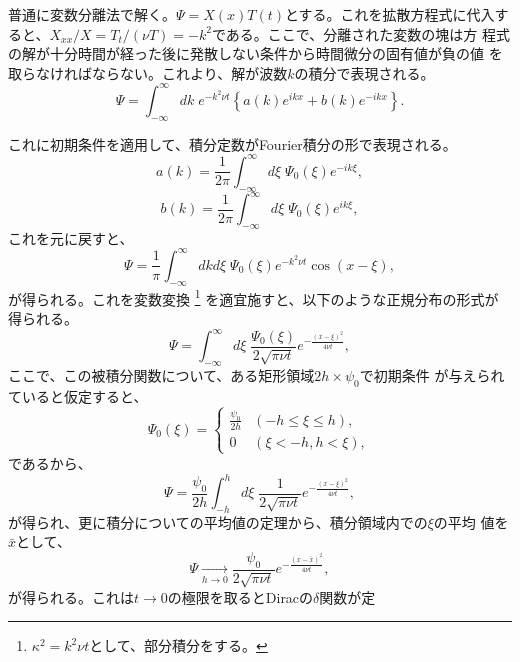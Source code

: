 普通に変数分離法で解く。$\Psi=X(x)T(t)$とする。これを拡散方程式に代入す
ると、$X_{xx}/X=T_t/(\nu T)=-k^2$である。ここで、分離された変数の塊は方
程式の解が十分時間が経った後に発散しない条件から時間微分の固有値が負の値
を取らなければならない。これより、解が波数$k$の積分で表現される。
\begin{equation}
 \Psi = \int_{-\infty}^{\infty}dk\mspace{5mu}
  e^{-k^2\nu t}\left\{a(k)e^{ikx}+b(k)e^{-ikx}\right\}.
\end{equation}

これに初期条件を適用して、積分定数がFourier積分の形で表現される。
\begin{equation}
 a(k) = \frac{1}{2\pi}\int_{-\infty}^{\infty}d\xi\mspace{5mu}\Psi_0(\xi)e^{-ik\xi},
\end{equation}
\begin{equation}
 b(k) = \frac{1}{2\pi}\int_{-\infty}^{\infty}d\xi\mspace{5mu}\Psi_0(\xi)e^{ik\xi},
\end{equation}
これを元に戻すと、
\begin{equation}
 \Psi = \frac{1}{\pi}\int_{-\infty}^{\infty}dkd\xi\mspace{5mu}
  \Psi_0(\xi)e^{-k^2\nu t}\cos (x-\xi),
\end{equation}
が得られる。これを変数変換
\footnote{$\kappa^2 = k^2\nu t$として、部分積分をする。}
を適宜施すと、以下のような正規分布の形式が得られる。
\begin{equation}
  \Psi = \int_{-\infty}^{\infty}d\xi\mspace{5mu}
  \frac{\Psi_0(\xi)}{2\sqrt{\pi\nu t}}e^{-\frac{(x-\xi)^2}{4\nu t}},
\end{equation}
ここで、この被積分関数について、ある矩形領域$2h\times \psi_0$で初期条件
が与えられていると仮定すると、
\begin{equation}
 \Psi_0(\xi) =
  \begin{cases}
   \frac{\psi_0}{2h} & (-h \leq \xi \leq h), \\
   0 & (\xi < -h, h < \xi),
  \end{cases}
\end{equation}
であるから、
\begin{equation}
  \Psi = \frac{\psi_0}{2h}\int_{-h}^{h}d\xi\mspace{5mu}
  \frac{1}{2\sqrt{\pi\nu t}}e^{-\frac{(x-\xi)^2}{4\nu t}},
\end{equation}
が得られ、更に積分についての平均値の定理から、積分領域内での$\xi$の平均
値を$\bar{x}$として、
\begin{equation}
   \Psi \xrightarrow[h\to 0]{}
  \frac{\psi_0}{2\sqrt{\pi\nu t}}e^{-\frac{(x-\bar{x})^2}{4\nu t}},
\end{equation}
が得られる。これは$t\rightarrow 0$の極限を取るとDiracの$\delta$関数が定
